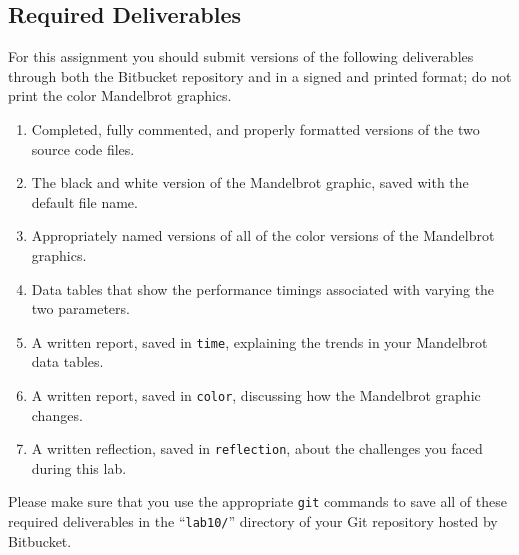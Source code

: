 \vspace{-0.15in}
\subsection*{Required Deliverables}
\vspace{-0.05in}

For this assignment you should submit versions of the following deliverables through both the Bitbucket
repository and in a signed and printed format; do not print the color Mandelbrot graphics.

\vspace{-0.125in}
\begin{enumerate}
    \setlength{\itemsep}{0pt}

  \item Completed, fully commented, and properly formatted versions of the two source code files.
  \item The black and white version of the Mandelbrot graphic, saved with the default file name.
  \item Appropriately named versions of all of the color versions of the Mandelbrot graphics.
  \item Data tables that show the performance timings associated with varying the two parameters.
  \item A written report, saved in {\tt time}, explaining the trends in your Mandelbrot data tables.
  \item A written report, saved in {\tt color}, discussing how the Mandelbrot graphic changes.
  \item A written reflection, saved in {\tt reflection}, about the challenges you faced during this lab.

\end{enumerate}
\vspace{-0.1in}

Please make sure that you use the appropriate {\tt git} commands to save all of these required deliverables in the
``{\tt lab10/}'' directory of your Git repository hosted by Bitbucket.




